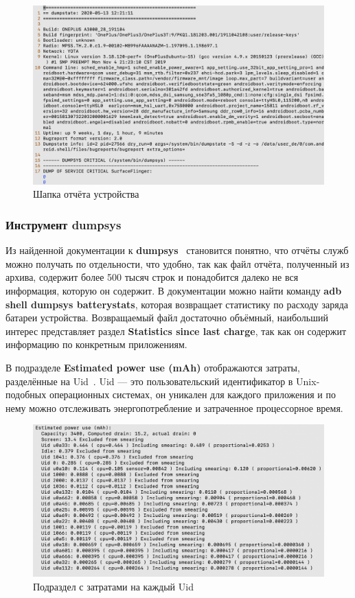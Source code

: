 \documentclass[a4paper,14pt]{extarticle} %
\begin{document}
	\begin{figure}[!htb]
		\includegraphics[width=\textwidth]{report_header}
		\caption{Шапка отчёта устройства}
		\label{fig:report_header}
	\end{figure}

	\subsubsection{Инструмент dumpsys} \label{subsub:dumpsys}
	
	Из найденной документации к \textbf{dumpsys}~\parencite{Dumpsys} становится понятно, что отчёты служб можно получать по отдельности, что удобно, так как файл отчёта, полученный из архива, содержит более 500 тысяч строк и понадобится далеко не вся информация, которую он содержит. В документации можно найти команду \textbf{adb shell dumpsys batterystats}, которая возвращает статистику по расходу заряда батареи устройства. Возвращаемый файл достаточно объёмный, наибольший интерес представляет раздел \textbf{Statistics since last charge}, так как он содержит информацию по конкретным приложениям.
	
	В подразделе \textbf{Estimated power use (mAh)} отображаются затраты, разделённые на Uid~\ris{\ref{fig:estimated_use}}. Uid --- это пользовательский идентификатор в Unix-подобных операционных системах, он уникален для каждого приложения и по нему можно отслеживать энергопотребление и затраченное процессорное время.
	
	\begin{figure}[!htb]
		\includegraphics[width=\textwidth]{estimated_use}
		\caption{Подраздел с затратами на каждый Uid}
		\label{fig:estimated_use}
	\end{figure}
	
\end{document}
